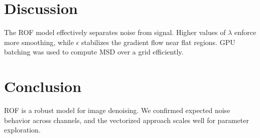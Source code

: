 \documentclass[11pt]{article}
\begin{document}
\section*{Discussion}
The ROF model effectively separates noise from signal. Higher values of $\lambda$ enforce more smoothing, while $\epsilon$ stabilizes the gradient flow near flat regions. GPU batching was used to compute MSD over a grid efficiently.

\section*{Conclusion}
ROF is a robust model for image denoising. We confirmed expected noise behavior across channels, and the vectorized approach scales well for parameter exploration.
\end{document}

